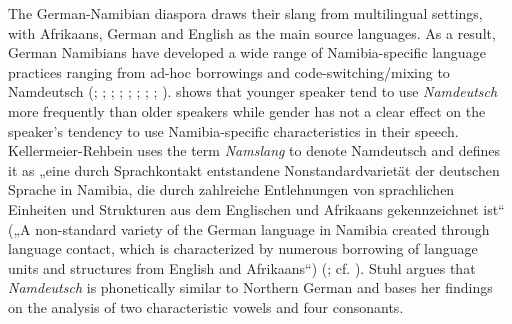 \documentclass[output=paper]{langsci/langscibook}
\begin{document}
The German-Namibian diaspora draws their slang from multilingual settings, with Afrikaans, German and English as the main source languages. As a result, German Namibians have developed a wide range of Namibia-specific language practices ranging from ad-hoc borrowings and code-switching/mixing to Namdeutsch (\citealt{bohm_deutsch_2003}; \citealt{duck_namibia_2018}; \citealt{gretschel_status_1995}; \citealt{kellermeier-rehbein_namslang_2015, kellermeier-rehbein_sprache_2016}; \citealt{nockler_sprachmischung_1963}; \citealt{putz_sudwesterdeutsch_1991}; \citealt{wiese_deutsch_2014, wiese_german_2017}; \citealt{wiese_registerdifferenzierung_2021}; \citealt{zimmer_deutsch_2019}). 
 shows that younger speaker tend to use \textit{Namdeutsch} more frequently than older speakers while gender has not a clear effect on the speaker’s tendency to use Namibia-specific characteristics in their speech. Kellermeier-Rehbein uses the term \textit{Namslang} to denote Namdeutsch and defines it as „eine durch Sprachkontakt entstandene Nonstandardvarietät der deutschen Sprache in Namibia, die durch zahlreiche Entlehnungen von sprachlichen Einheiten und Strukturen aus dem Englischen und Afrikaans gekennzeichnet ist“ („A non-standard variety of the German language in Namibia created through language contact, which is characterized by numerous borrowing of language units and structures from English and Afrikaans“) (\citealt[228]{kellermeier-rehbein_sprache_2016}; cf. \citealt{radke_urban_inpress}). Stuhl  argues that \textit{Namdeutsch} is phonetically similar to Northern German and bases her findings on the analysis of two characteristic vowels and four consonants. %
\end{document}
